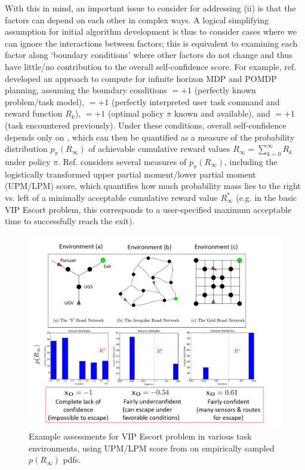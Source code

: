 With this in mind, an important issue to consider for addressing (ii) is that the factors can depend on each other in complex ways. A logical simplifying assumption for initial algorithm development is thus to consider cases where we can ignore the interactions between factors; this is equivalent to examining each factor along `boundary conditions' where other factors do not change and thus have little/no contribution to the overall self-confidence score. For example, ref. \cite{Aitken2016-cv} developed an approach to compute \xO{} for infinite horizon MDP and POMDP planning, assuming the boundary conditions \xM$=+1$ (perfectly known problem/task model), \xI $= +1$ (perfectly interpreted user task command and reward function $R_k$), \xQ$=+1$ (optimal policy $\pi$ known and available), and \xP$=+1$ (task encountered previously). Under these conditions, overall self-confidence depends only on \xO, which can then be quantified as a measure of the probability distribution $p_{\pi}(R_{\infty})$ of achievable cumulative reward values $R_{\infty} = \sum_{k=0}^{\infty}R_{k}$ under policy $\pi$. Ref. \cite{Aitken2016-cv} considers several measures of $p_{\pi}(R_{\infty})$, including the logistically transformed upper partial moment/lower partial moment (UPM/LPM) score, which quantifies how much probability mass lies to the right vs. left of a minimally acceptable cumulative reward value $R^*_{\infty}$ (e.g. in the basic VIP Escort problem, this corresponds to a user-specified maximum acceptable time to successfully reach the exit).
\begin{figure}[tbp]
    \centering
    \includegraphics[width=0.90\linewidth]{Figures/xO_envsOnly.png}
    \caption{Example \xO{} assessments for VIP Escort problem in various task environments, using UPM/LPM score from \cite{Aitken2016-cv} on empirically sampled $p(R_{\infty})$ pdfs.}
    \label{fig:xOexample}
\end{figure}


